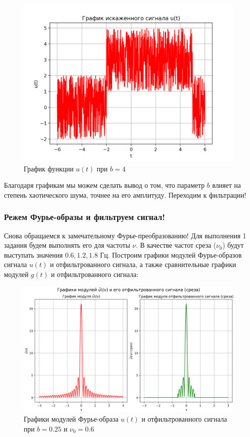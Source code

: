 \begin{figure}[ht!]
    \centering
    \includegraphics[scale=0.75]{media/1 task/high_freq/Noisy_4.png}
    \caption{График функции $u(t)$ при $b=4$}
    \label{fig:noisy_4}
\end{figure}

Благодаря графикам мы можем сделать вывод о том, что параметр $b$ влияет на степень хаотического шума, точнее на его амплитуду. Переходим к фильтрации!
\subsubsection{Режем Фурье-образы и фильтруем сигнал!}
 
Снова обращаемся к замечательному Фурье-преобразованию! Для выполнения 1 задания будем выполнять его для частоты $\nu$. В качестве частот среза ($\nu_0$) будут выступать значения $0.6, 1.2, 1.8$ Гц. Построим графики модулей Фурье-образов сигнала $u(t)$ и отфильтрованного сигнала, а также сравнительные графики модулей $g(t)$ и отфильтрованного сигнала:

\begin{figure}[ht!]
    \centering
    \includegraphics[scale=0.55]{media/1 task/high_freq/Fourier_Image_0,25_-0,5975975975975976.png}
    \caption{Графики модулей Фурье-образа $u(t)$ и отфильтрованного сигнала при $b=0.25$ и $\nu_0=0.6$}
    \label{fig:four_025_06}
\end{figure}

